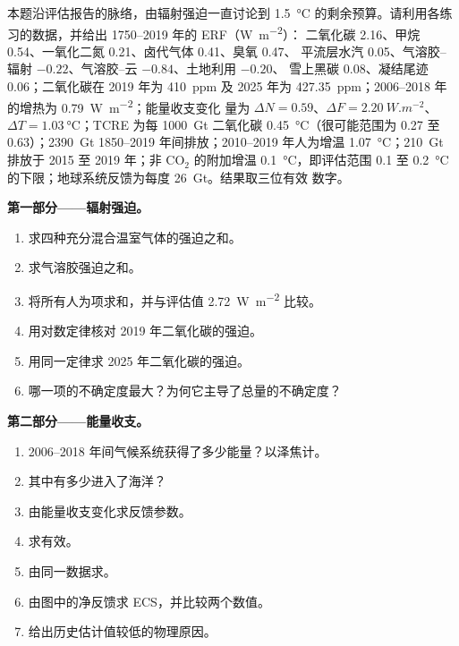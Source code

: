 \begin{problem}\label{pb:b2:anthropogenic-climate-change:1}
本题沿评估报告的脉络，由辐射强迫一直讨论到
\qty{1.5}{\celsius} 的剩余预算。请利用各练习的数据，并给出 1750--2019 年的 ERF（\unit{W.m^{-2}}）：
二氧化碳 2.16、甲烷 0.54、一氧化二氮 0.21、卤代气体 0.41、臭氧 0.47、
平流层水汽 0.05、气溶胶–辐射 $-0.22$、气溶胶–云 $-0.84$、土地利用 $-0.20$、
雪上黑碳 0.08、凝结尾迹 0.06；二氧化碳在 2019 年为 \qty{410}{ppm} 及
2025 年为 \qty{427.35}{ppm}；2006--2018 年的增热为 \qty{0.79}{W.m^{-2}}；能量收支变化
量为 $\Delta N = 0.59$、$\Delta F = \qty{2.20}{W.m^{-2}}$、$\Delta T = \qty{1.03}{\celsius}$；TCRE
为每 \qty{1000}{Gt} 二氧化碳 \qty{0.45}{\celsius}（很可能范围为 0.27 至 0.63）；\qty{2390}{Gt}
1850--2019 年间排放；2010--2019 年人为增温 \qty{1.07}{\celsius}；\qty{210}{Gt} 排放于
2015 至 2019 年；非 CO$_2$ 的附加增温 \qty{0.1}{\celsius}，即评估范围 0.1
至 \qty{0.2}{\celsius} 的下限；地球系统反馈为每度 \qty{26}{Gt}。结果取三位有效
数字。

\noindent\textbf{第一部分——辐射强迫。}
\begin{enumerate}
  \item 求四种充分混合温室气体的强迫之和。
  \item 求气溶胶强迫之和。
  \item 将所有人为项求和，并与评估值 \qty{2.72}{W.m^{-2}} 比较。
  \item 用对数定律核对 2019 年二氧化碳的强迫。
  \item 用同一定律求 2025 年二氧化碳的强迫。
  \item 哪一项的不确定度最大？为何它主导了总量的不确定度？
\end{enumerate}

\noindent\textbf{第二部分——能量收支。}
\begin{enumerate}[resume]
  \item 2006--2018 年间气候系统获得了多少能量？以泽焦计。
  \item 其中有多少进入了海洋？
  \item 由能量收支变化求反馈参数。
  \item 求有效。
  \item 由同一数据求。
  \item 由图中的净反馈求 ECS，并比较两个数值。
  \item 给出历史估计值较低的物理原因。
\end{enumerate}


\end{problem}
